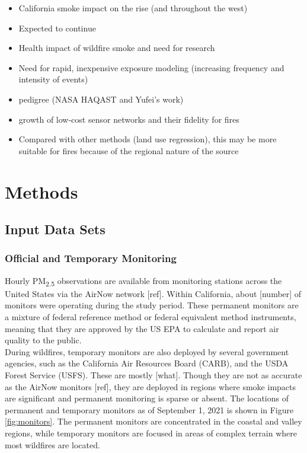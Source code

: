 \documentclass[gmd, manuscript]{copernicus}
\providecommand{\tightlist}{%
  \setlength{\itemsep}{0pt}\setlength{\parskip}{0pt}}
\begin{document}


\introduction[Introduction]

\begin{itemize}
\tightlist
\item
  California smoke impact on the rise (and throughout the west)
\item
  Expected to continue
\item
  Health impact of wildfire smoke and need for research
\item
  Need for rapid, inexpensive exposure modeling (increasing frequency
  and intensity of events)
\item
  pedigree (NASA HAQAST and Yufei's work)
\item
  growth of low-cost sensor networks and their fidelity for fires
\item
  Compared with other methods (land use regression), this may be more
  suitable for fires because of the regional nature of the source
\end{itemize}

\section{Methods}

\subsection{Input Data Sets}

\subsubsection{Official and Temporary Monitoring}

Hourly PM\textsubscript{2.5} observations are available from monitoring
stations across the United States via the AirNow network {[}ref{]}.
Within California, about {[}number{]} of monitors were operating during
the study period. These permanent monitors are a mixture of federal
reference method or federal equivalent method instruments, meaning that
they are approved by the US EPA to calculate and report air quality to
the public.\\
During wildfires, temporary monitors are also deployed by several
government agencies, such as the California Air Resources Board (CARB),
and the USDA Forest Service (USFS). These are mostly {[}what{]}. Though
they are not as accurate as the AirNow monitors {[}ref{]}, they are
deployed in regions where smoke impacts are significant and permanent
monitoring is sparse or absent. The locations of permanent and temporary
monitors as of September 1, 2021 is shown in Figure \ref{fig:monitors}.
The permanent monitors are concentrated in the coastal and valley
regions, while temporary monitors are focused in areas of complex
terrain where most wildfires are located.
\end{document}
